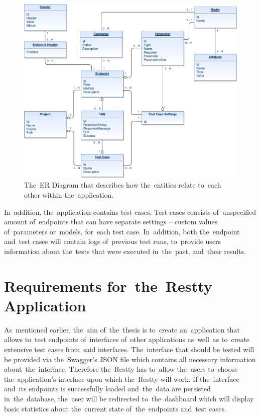 \begin{figure}[!hbt]
	\centering
	\includegraphics[scale=0.7]{./figures/erd.pdf}
	\caption{The~ER Diagram that describes how the~entities relate to~each other within the~application.}
\end{figure}

In~addition, the~application contains test cases. Test cases consists of~unspecified amount of~endpoints that can have
separate settings -- custom values of~parameters or~models, for~each test case. In~addition, both the~endpoint and~test cases will contain
logs of~previous test runs, to~provide users information about the~tests that were executed in~the~past, and~their results.


\section{Requirements for~the~Restty Application}
As~mentioned earlier, the~aim of~the~thesis is to~create an~application that
allows to~test endpoints of~interfaces of~other applications
as~well~as to~create extensive test cases from~said interfaces. The~interface
that should be tested will be provided via the~Swagger's JSON file which
contains all necessary information about~the~interface. Therefore the~Restty has
to~allow the~users to~choose the~application's interface upon which the~Restty will work.
 If the~interface and~its endpoints is successfully loaded
and~the~data are persisted in~the~database, the~user will be
redirected to~the~dashboard which will display basic statistics about
the~current state of~the~endpoints and~test cases.

